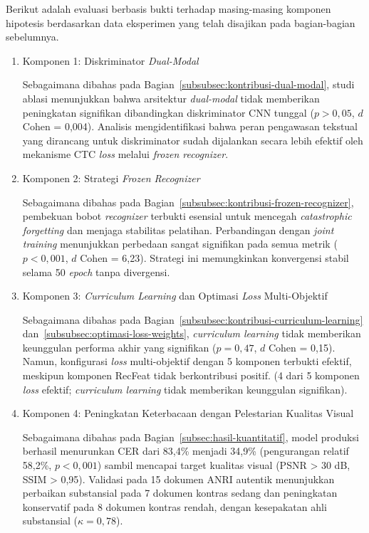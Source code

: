 \documentclass[12pt,a4paper]{article}
\begin{document}
Berikut adalah evaluasi berbasis bukti terhadap masing-masing komponen hipotesis berdasarkan data eksperimen yang telah disajikan pada bagian-bagian sebelumnya.

\begin{enumerate}[leftmargin=1.5em, labelsep=0.5em, itemindent=0pt, label=\arabic*., topsep=0pt, partopsep=0pt]
    \item Komponen 1: Diskriminator \textit{Dual-Modal}
    
    Sebagaimana dibahas pada Bagian~\ref{subsubsec:kontribusi-dual-modal}, studi ablasi menunjukkan bahwa arsitektur \textit{dual-modal} tidak memberikan peningkatan signifikan dibandingkan diskriminator CNN tunggal ($p > 0,05$, $d$ Cohen = 0,004). Analisis mengidentifikasi bahwa peran pengawasan tekstual yang dirancang untuk diskriminator sudah dijalankan secara lebih efektif oleh mekanisme CTC \textit{loss} melalui \textit{frozen recognizer}.

    \item Komponen 2: Strategi \textit{Frozen Recognizer}
    
    Sebagaimana dibahas pada Bagian~\ref{subsubsec:kontribusi-frozen-recognizer}, pembekuan bobot \textit{recognizer} terbukti esensial untuk mencegah \textit{catastrophic forgetting} dan menjaga stabilitas pelatihan. Perbandingan dengan \textit{joint training} menunjukkan perbedaan sangat signifikan pada semua metrik ($p < 0,001$, $d$ Cohen = 6,23). Strategi ini memungkinkan konvergensi stabil selama 50 \textit{epoch} tanpa divergensi.

    \item Komponen 3: \textit{Curriculum Learning} dan Optimasi \textit{Loss} Multi-Objektif
    
    Sebagaimana dibahas pada Bagian~\ref{subsubsec:kontribusi-curriculum-learning} dan~\ref{subsubsec:optimasi-loss-weights}, \textit{curriculum learning} tidak memberikan keunggulan performa akhir yang signifikan ($p = 0,47$, $d$ Cohen = 0,15). Namun, konfigurasi \textit{loss} multi-objektif dengan 5 komponen terbukti efektif, meskipun komponen RecFeat tidak berkontribusi positif. (4 dari 5 komponen \textit{loss} efektif; \textit{curriculum learning} tidak memberikan keunggulan signifikan).

    \item Komponen 4: Peningkatan Keterbacaan dengan Pelestarian Kualitas Visual
    
    Sebagaimana dibahas pada Bagian~\ref{subsec:hasil-kuantitatif}, model produksi berhasil menurunkan CER dari 83,4\% menjadi 34,9\% (pengurangan relatif 58,2\%, $p < 0,001$) sambil mencapai target kualitas visual (PSNR > 30 dB, SSIM > 0,95). Validasi pada 15 dokumen ANRI autentik menunjukkan perbaikan substansial pada 7 dokumen kontras sedang dan peningkatan konservatif pada 8 dokumen kontras rendah, dengan kesepakatan ahli substansial ($\kappa = 0,78$).
\end{enumerate}
\end{document}

